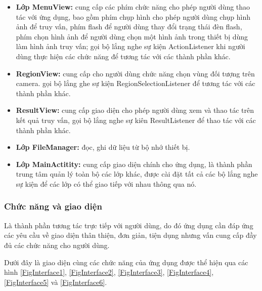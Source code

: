 \begin{itemize}
\item \textbf{Lớp MenuView:} cung cấp các phím chức năng cho phép người dùng thao tác với ứng dụng, bao gồm phím chụp hình cho phép người dùng chụp hình ảnh để truy vấn, phím flash để người dùng thay đổi trạng thái đèn flash, phím chọn hình ảnh để người dùng chọn một hình ảnh trong thiết bị dùng làm hình ảnh truy vấn; gọi bộ lắng nghe sự kiện ActionListener khi người dùng thực hiện các chức năng để tương tác với các thành phần khác.

\item \textbf{RegionView:} cung cấp cho người dùng chức năng chọn vùng đối tượng trên camera. gọi bộ lắng ghe sự kiện RegionSelectionListener để tương tác với các thành phần khác.

\item \textbf{ResultView:} cung cấp giao diện cho phép người dùng xem và thao tác trên kết quả truy vấn, gọi bộ lắng nghe sự kiên ResultListener để thao tác với các thành phần khác.

\item \textbf{Lớp FileManager:} đọc, ghi dữ liệu từ bộ nhớ thiết bị.

\item \textbf{Lớp MainActitity:} cung cấp giao diện chính cho ứng dụng, là thành phần trung tâm quản lý toàn bộ các lớp khác, được cài đặt tất cả các bộ lắng nghe sự kiện để các lớp có thể giao tiếp với nhau thông qua nó.

\end{itemize}

\subsubsection{Chức năng và giao diện}
Là thành phần tương tác trực tiếp với người dùng, do đó ứng dụng cần đáp ứng các yêu cầu về giao diện thân thiện, đơn giản, tiện dụng nhưng vấn cung cấp đầy đủ các chức năng cho người dùng.

Dưới đây là giao diện cùng các chức năng của ứng dụng được thể hiện qua các hình \ref{FigInterface1}, \ref{FigInterface2}, \ref{FigInterface3}, \ref{FigInterface4}, \ref{FigInterface5} và \ref{FigInterface6}.

